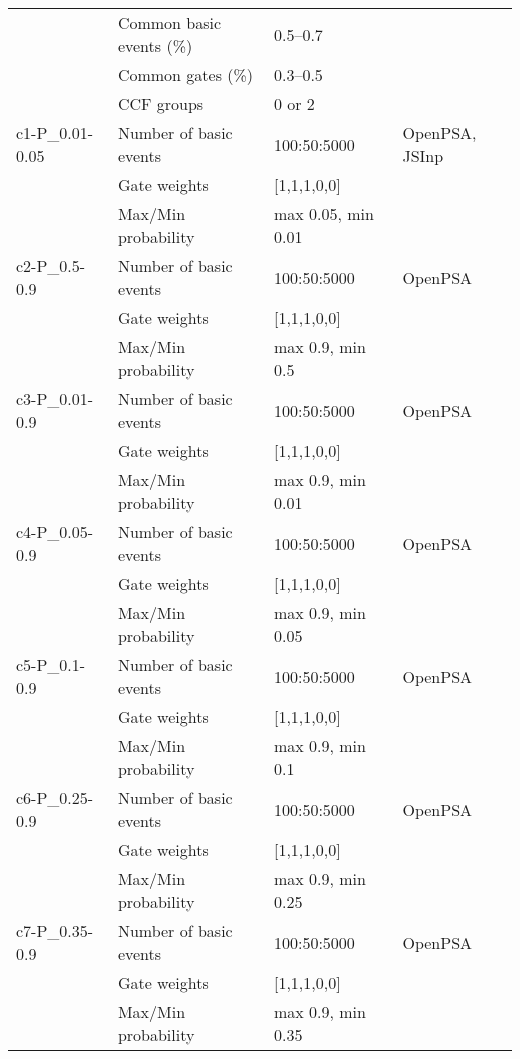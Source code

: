 \begin{longtable}{@{}llll@{}}
                     & Common basic events (\%) & 0.5--0.7                    &          \\
                     & Common gates (\%)      & 0.3--0.5                      &          \\
                     & CCF groups             & 0 or 2                        &          \\
\midrule
c1-P\_0.01-0.05      & Number of basic events & 100:50:5000                   & OpenPSA, JSInp \\
                     & Gate weights           & [1,1,1,0,0]                   &                 \\
                     & Max/Min probability    & max 0.05, min 0.01            &                 \\
\midrule
c2-P\_0.5-0.9        & Number of basic events & 100:50:5000                   & OpenPSA \\
                     & Gate weights           & [1,1,1,0,0]                   &         \\
                     & Max/Min probability    & max 0.9, min 0.5              &         \\
\midrule
c3-P\_0.01-0.9       & Number of basic events & 100:50:5000                   & OpenPSA \\
                     & Gate weights           & [1,1,1,0,0]                   &         \\
                     & Max/Min probability    & max 0.9, min 0.01             &         \\
\midrule
c4-P\_0.05-0.9       & Number of basic events & 100:50:5000                   & OpenPSA \\
                     & Gate weights           & [1,1,1,0,0]                   &         \\
                     & Max/Min probability    & max 0.9, min 0.05             &         \\
\midrule
c5-P\_0.1-0.9        & Number of basic events & 100:50:5000                   & OpenPSA \\
                     & Gate weights           & [1,1,1,0,0]                   &         \\
                     & Max/Min probability    & max 0.9, min 0.1              &         \\
\midrule
c6-P\_0.25-0.9       & Number of basic events & 100:50:5000                   & OpenPSA \\
                     & Gate weights           & [1,1,1,0,0]                   &         \\
                     & Max/Min probability    & max 0.9, min 0.25             &         \\
\midrule
c7-P\_0.35-0.9       & Number of basic events & 100:50:5000                   & OpenPSA \\
                     & Gate weights           & [1,1,1,0,0]                   &         \\
                     & Max/Min probability    & max 0.9, min 0.35             &         \\
\bottomrule
\end{longtable}